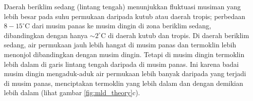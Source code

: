 \begin{spacing}{1.5}
	 Daerah beriklim sedang (lintang tengah) menunjukkan fluktuasi musiman yang lebih besar pada suhu permukaan daripada kutub atau daerah tropis; perbedaan $8-15^\circ$C dari musim panas ke musim dingin di zona beriklim sedang, dibandingkan dengan hanya $\sim 2^\circ$C di daerah kutub dan tropis. Di daerah beriklim sedang, air permukaan jauh lebih hangat di musim panas dan termoklin lebih menonjol dibandingkan dengan musim dingin. Tetapi di musim dingin termoklin lebih dalam di garis lintang tengah daripada di musim panas. Ini karena badai musim dingin mengaduk-aduk air permukaan lebih banyak daripada yang terjadi di musim panas, menciptakan termoklin yang lebih dalam dan dengan demikian lebih dalam (lihat gambar \ref{fig:mld_theory}c).
\end{spacing}
\vspace{-0.1pc}
%
